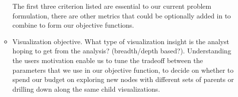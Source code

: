 \documentclass[11pt]{article}
\begin{document}
\begin{enumerate}
\begin{itemize}
\begin{itemize}
  \end{itemize}
The first three criterion listed are essential to our current problem formulation, there are other metrics that could be optionally added in to combine to form our objective functions.
\item Visualization objective. What type of visualization insight is the analyst hoping to get from the analysis? (breadth/depth based?). Understanding the users motivation enable us to tune the tradeoff between the parameters that we use in our objective function, to decide on whether to spend our budget on exploring new nodes with different sets of parents or drilling down along the same child visualizations.
\end{itemize}

\end{enumerate}

\fi
    
    
    
    












%
%
\end{document}
